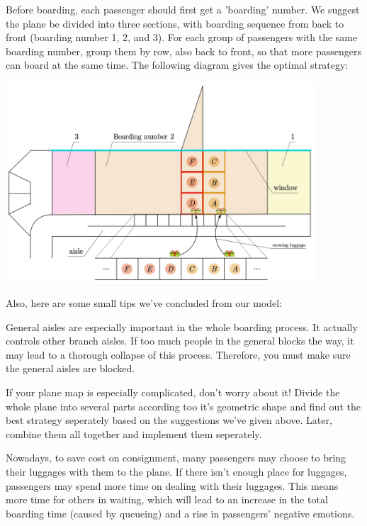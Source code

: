\documentclass{article}
\begin{document}
\begin{itemize}
		Before boarding, each passenger should first get a 'boarding' number. We suggest the plane be divided into three sections, with boarding sequence from back to front (boarding number 1, 2, and 3). For each group of passengers with the same boarding number, group them by row, also back to front, so that more passengers can board at the same time. The following diagram gives the optimal strategy:
		\begin{center}
			\includegraphics[width=11.6cm]{advice.jpg}
		\end{center}
	\end{itemize}

	Also, here are some small tips we've concluded from our model:
	\begin{enumerate}

		General aisles are especially important in the whole boarding process. It actually controls other branch aisles. If too much people in the general blocks the way, it may lead to a thorough collapse of this process. Therefore, you must make sure the general aisles are blocked.

		If your plane map is especially complicated, don't worry about it! Divide the whole plane into several parts according too it's geometric shape and find out the best strategy seperately based on the suggestions we've given above. Later, combine them all together and implement them seperately.

		Nowadays, to save cost on consignment, many passengers may choose to bring their luggages with them to the plane. If there isn't enough place for luggages, passengers may spend more time on dealing with their luggages. This means more time for others in waiting, which will lead to an increase in the total boarding time (caused by queueing) and a rise in passengers' negative emotions.
	\end{enumerate}
\end{document}
